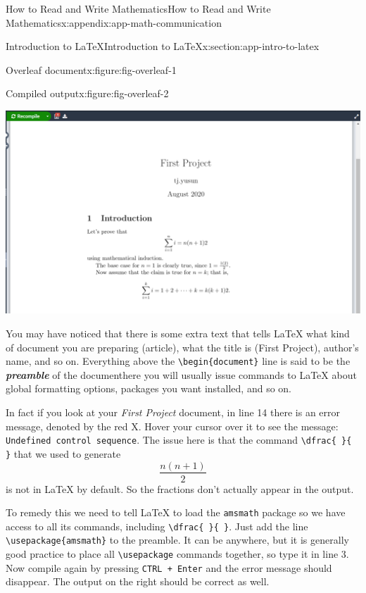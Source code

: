 \documentclass[oneside,10pt,]{book}
\newcommand{\mono}[1]{\texttt{#1}}
\newcommand{\alert}[1]{\textbf{\textit{#1}}}
\numberwithin{equation}{section}
\begin{document}
\begin{appendixptx}{How to Read and Write Mathematics}{}{How to Read and Write Mathematics}{}{}{x:appendix:app-math-communication}
\begin{sectionptx}{Introduction to \LaTeX{}}{}{Introduction to \LaTeX{}}{}{}{x:section:app-intro-to-latex}
\begin{figureptx}{Overleaf document}{x:figure:fig-overleaf-1}{}
\begin{image}{0.05}{0.9}{0.05}
\end{image}%
\tcblower
\end{figureptx}%
\begin{figureptx}{Compiled output}{x:figure:fig-overleaf-2}{}%
\begin{image}{0.05}{0.9}{0.05}%
\includegraphics[width=\linewidth]{figs/latex-example-overleaf2.png}
\end{image}%
\tcblower
\end{figureptx}%
You may have noticed that there is some extra text that tells \LaTeX{} what kind of document you are preparing (article), what the title is (First Project), author's name, and so on. Everything above the \mono{\textbackslash{}begin\{document\}} line is said to be the \alert{preamble} of the document\textemdash{}here you will usually issue commands to \LaTeX{} about global formatting options, packages you want installed, and so on.%
\par
In fact if you look at your \emph{First Project} document, in line 14 there is an error message, denoted by the red X. Hover your cursor over it to see the message: \mono{Undefined control sequence}. The issue here is that the command \mono{\textbackslash{}dfrac\{ \}\{ \}} that we used to generate%
\begin{equation*}
\dfrac{n(n+1)}{2}
\end{equation*}
is not in \LaTeX{} by default. So the fractions don't actually appear in the output.%
\par
To remedy this we need to tell \LaTeX{} to load the \mono{amsmath} package so we have access to all its commands, including \mono{\textbackslash{}dfrac\{ \}\{ \}}. Just add the line \mono{\textbackslash{}usepackage\{amsmath\}} to the preamble. It can be anywhere, but it is generally good practice to place all \mono{\textbackslash{}usepackage} commands together, so type it in line 3. Now compile again by pressing \mono{CTRL + Enter} and the error message should disappear. The output on the right should be correct as well.%

\end{sectionptx}
\end{appendixptx}
\end{document}
